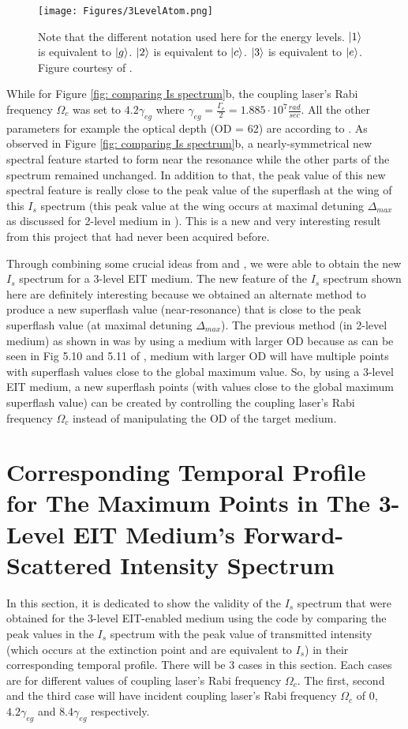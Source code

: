 \begin{figure}
    \centering
    \texttt{[image: Figures/3LevelAtom.png]}
    \caption{Note that the different notation used here for the energy levels. $\ket{1}$ is equivalent to $\ket{g}$. $\ket{2}$ is equivalent to $\ket{c}$. $\ket{3}$ is equivalent to $\ket{e}$. Figure courtesy of \protect\cite{Jeong2009}.}
    \label{fig: 3LevelAtom}
\end{figure}

While for Figure \ref{fig: comparing Is spectrum}b, the coupling laser's Rabi frequency $\Omega_{c}$ was set to $4.2\gamma_{eg}$ where $\gamma_{eg} = \frac{\Gamma_{e}}{2} = 1.885 \cdot 10^{7} \frac{rad}{sec}$. All the other parameters for example the optical depth (OD = 62) are according to \cite{jeong2010slow}. As observed in Figure \ref{fig: comparing Is spectrum}b, a nearly-symmetrical new spectral feature started to form near the resonance while the other parts of the spectrum remained unchanged. In addition to that, the peak value of this new spectral feature is really close to the peak value of the superflash at the wing of this $I_{s}$ spectrum (this peak value at the wing occurs at maximal detuning $\Delta_{max}$ as discussed for 2-level medium in \cite{Kwong2017}). This is a new and very interesting result from this project that had never been acquired before.

Through combining some crucial ideas from \cite{Kwong2014} and \cite{jeong2010slow}, we were able to obtain the new $I_{s}$ spectrum for a 3-level EIT medium. The new feature of the $I_{s}$ spectrum shown here are definitely interesting because we obtained an alternate method to produce a new superflash value (near-resonance) that is close to the peak superflash value (at maximal detuning $\Delta_{max}$). The previous method (in 2-level medium) as shown in \cite{Kwong2017} was by using a medium with larger OD because as can be seen in Fig 5.10 and 5.11 of \cite{Kwong2017}, medium with larger OD will have multiple points with superflash values close to the global maximum value. So, by using a 3-level EIT medium, a new superflash points (with values close to the global maximum superflash value) can be created by controlling the coupling laser's Rabi frequency $\Omega_{c}$ instead of manipulating the OD of the target medium.


\section{Corresponding Temporal Profile for The Maximum Points in The 3-Level EIT Medium's Forward-Scattered Intensity Spectrum}
In this section, it is dedicated to show the validity of the $I_{s}$ spectrum that were obtained for the 3-level EIT-enabled medium using the code by comparing the peak values in the $I_{s}$ spectrum with the peak value of transmitted intensity (which occurs at the extinction point and are equivalent to $I_{s}$) in their corresponding temporal profile. There will be 3 cases in this section. Each cases are for different values of coupling laser's Rabi frequency $\Omega_{c}$. The first, second and the third case will have incident coupling laser's Rabi frequency $\Omega_{c}$ of $0$, $4.2\gamma_{eg}$ and $8.4\gamma_{eg}$ respectively.

